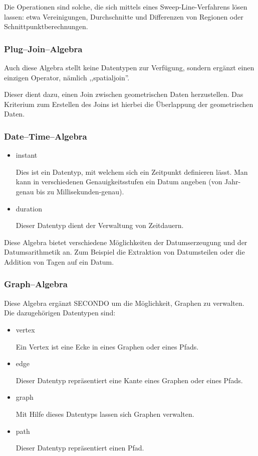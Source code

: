 Die Operationen sind solche, die sich mittels eines Sweep-Line-Verfahrens lösen lassen: etwa Vereinigungen, Durchschnitte und Differenzen von Regionen oder Schnittpunktberechnungen.

\subsubsection{Plug--Join--Algebra}

Auch diese Algebra stellt keine Datentypen zur Verfügung, sondern ergänzt einen einzigen Operator, nämlich ,,spatialjoin''.

Dieser dient dazu, einen Join zwischen geometrischen Daten herzustellen. Das Kriterium zum Erstellen des Joins ist hierbei die Überlappung der geometrischen Daten. 

\subsubsection{Date--Time--Algebra}
\begin{itemize}
\item instant

Dies ist ein Datentyp, mit welchem sich ein Zeitpunkt definieren lässt. Man kann in verschiedenen Genauigkeitsstufen ein Datum angeben (von Jahr-genau bis zu Millisekunden-genau).
\item duration

Dieser Datentyp dient der Verwaltung von Zeitdauern.
\end{itemize}

Diese Algebra bietet verschiedene Möglichkeiten der Datumserzeugung und der Datumsarithmetik an. Zum Beispiel die Extraktion von Datumsteilen oder die Addition von Tagen auf ein Datum.

\subsubsection{Graph--Algebra}

Diese Algebra ergänzt SECONDO um die Möglichkeit, Graphen zu verwalten. Die dazugehörigen Datentypen sind:

\begin{itemize}
\item vertex

Ein Vertex ist eine Ecke in eines Graphen oder eines Pfads.
\item edge

Dieser Datentyp repräsentiert eine Kante eines Graphen oder eines Pfads.
\item graph

Mit Hilfe dieses Datentyps lassen sich Graphen verwalten.
\item path

Dieser Datentyp repräsentiert einen Pfad.
\end{itemize}

